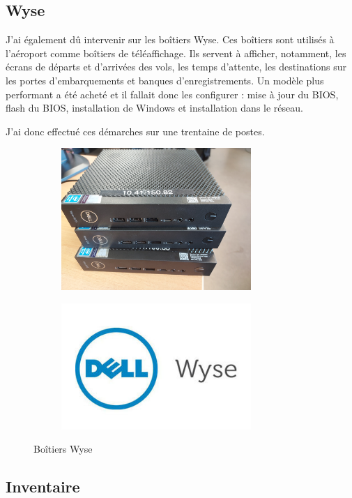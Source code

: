 \subsection{Wyse}

J’ai également dû intervenir sur les boîtiers Wyse. Ces boîtiers sont utilisés à l’aéroport comme boîtiers de téléaffichage. Ils servent à afficher, notamment, les écrans de départs et d’arrivées des vols, les temps d’attente, les destinations sur les portes d’embarquements et banques d'enregistrements. Un modèle plus performant a été acheté et il fallait donc les configurer : mise à jour du BIOS, flash du BIOS, installation de Windows et installation dans le réseau.


J’ai donc effectué ces démarches sur une trentaine de postes.\newline

\begin{figure}[hbt!]
  \begin{subfigure}{0.5\textwidth}
    \centering
    \includegraphics[width=7.2cm]{Images/wyse.jpg}  
    \label{fig:wyse}
  \end{subfigure}
  \begin{subfigure}{0.5\textwidth}
    \centering
    \includegraphics[width=7.2cm]{Images/wyse_logo.jpg}  
    \label{fig:logowyse}
  \end{subfigure}
  \caption{Boîtiers Wyse}
\end{figure}

\subsection{Inventaire}

